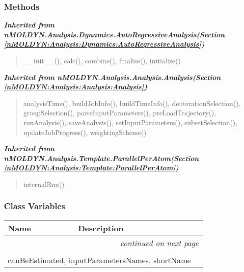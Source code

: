 
  \subsubsection{Methods}


\large{\textbf{\textit{Inherited from nMOLDYN.Analysis.Dynamics.AutoRegressiveAnalysis\textit{(Section \ref{nMOLDYN:Analysis:Dynamics:AutoRegressiveAnalysis})}}}}

\begin{quote}
\_\_init\_\_(), calc(), combine(), finalize(), initialize()
\end{quote}

\large{\textbf{\textit{Inherited from nMOLDYN.Analysis.Analysis.Analysis\textit{(Section \ref{nMOLDYN:Analysis:Analysis:Analysis})}}}}

\begin{quote}
analysisTime(), buildJobInfo(), buildTimeInfo(), deuterationSelection(), groupSelection(), parseInputParameters(), preLoadTrajectory(), runAnalysis(), saveAnalysis(), setInputParameters(), subsetSelection(), updateJobProgress(), weightingScheme()
\end{quote}

\large{\textbf{\textit{Inherited from nMOLDYN.Analysis.Template.ParallelPerAtom\textit{(Section \ref{nMOLDYN:Analysis:Template:ParallelPerAtom})}}}}

\begin{quote}
internalRun()
\end{quote}


  \subsubsection{Class Variables}

    \vspace{-1cm}
\hspace{\varindent}\begin{longtable}{|p{\varnamewidth}|p{\vardescrwidth}|l}
\cline{1-2}
\cline{1-2} \centering \textbf{Name} & \centering \textbf{Description}& \\
\cline{1-2}
\endhead\cline{1-2}\multicolumn{3}{r}{\small\textit{continued on next page}}\\\endfoot\cline{1-2}
\endlastfoot\multicolumn{2}{|l|}{\textit{Inherited from nMOLDYN.Analysis.Dynamics.AutoRegressiveAnalysis \textit{(Section \ref{nMOLDYN:Analysis:Dynamics:AutoRegressiveAnalysis})}}}\\
\multicolumn{2}{|p{\varwidth}|}{\raggedright canBeEstimated, inputParametersNames, shortName}\\
\cline{1-2}
\end{longtable}

